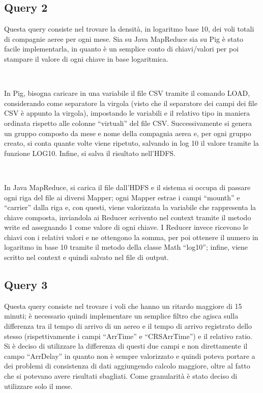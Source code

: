 \documentclass[11pt]{article} %
\begin{document}
\subsection{Query 2}

Questa query consiste nel trovare la densità, in logaritmo base 10, dei voli totali di compagnie aeree per ogni mese. Sia su Java MapReduce sia su Pig è stato facile implementarla, in quanto è un semplice conto di chiavi/valori per poi stampare il valore di ogni chiave in base logaritmica.

~

In Pig, bisogna caricare in una variabile il file CSV tramite il comando LOAD, considerando come separatore la virgola (visto che il separatore dei campi dei file CSV è appunto la virgola), impostando le variabili e il relativo tipo in maniera ordinata rispetto alle colonne ``virtuali'' del file CSV. Successivamente si genera un gruppo composto da mese e nome della compagnia aerea e, per ogni gruppo creato, si conta quante volte viene ripetuto, salvando in log 10 il valore tramite la funzione LOG10. Infine, si salva il risultato nell'HDFS.

~

In Java MapReduce, si carica il file dall'HDFS e il sistema si occupa di passare ogni riga del file ai diversi Mapper; ogni Mapper estrae i campi ``mounth'' e ``carrier'' dalla riga e, con questi, viene valorizzata la variabile che rappresenta la chiave composta, inviandola ai Reducer scrivento nel context tramite il metodo write ed assegnando 1 come valore di ogni chiave. I Reducer invece ricevono le chiavi con i relativi valori e ne ottengono la somma, per poi ottenere il numero in logaritmo in base 10 tramite il metodo della classe Math ``log10''; infine, viene scritto nel context e quindi salvato nel file di output.

\subsection{Query 3}

Questa query consiste nel trovare i voli che hanno un ritardo maggiore di 15 minuti; è necessario quindi implementare un semplice filtro che agisca sulla differenza tra il tempo di arrivo di un aereo e il tempo di arrivo registrato dello stesso (rispettivamente i campi ``ArrTime'' e ``CRSArrTime'') e il relativo ratio. Si è deciso di utilizzare la differenza di questi due campi e non direttamente il campo ``ArrDelay'' in quanto non è sempre valorizzato e quindi poteva portare a dei problemi di consistenza di dati aggiungendo calcolo maggiore, oltre al fatto che si potevano avere risultati sbagliati. Come granularità è stato deciso di utilizzare solo il mese.
\end{document}
